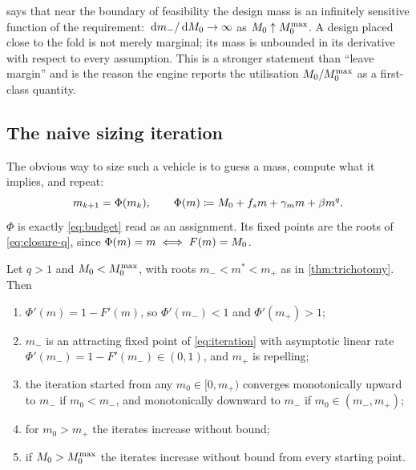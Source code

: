 \begin{remark}
 says that near the boundary of feasibility the design mass is
an infinitely sensitive function of the requirement: $\,\mathrm{d} m_-/\,\mathrm{d} M_0 \to
\infty$ as $M_0\uparrow M_0^{\max}$. A design placed close to the fold is not
merely marginal; its mass is unbounded in its derivative with respect to every
assumption. This is a stronger statement than ``leave margin'' and is the
reason the engine reports the utilisation $M_0/M_0^{\max}$ as a first-class
quantity.
\end{remark}

\subsection{The naive sizing iteration}

The obvious way to size such a vehicle is to guess a mass, compute what it
implies, and repeat:
\begin{equation}
  m_{k+1} = \Phi(m_k),
  \qquad
  \Phi(m) \coloneqq M_0 + f_s m + \gamma_m m + \beta m^{q} .
  \label{eq:iteration}
\end{equation}
$\Phi$ is exactly \cref{eq:budget} read as an assignment. Its fixed points are
the roots of \cref{eq:closure-q}, since
$\Phi(m)=m \iff F(m)=M_0$.

\begin{theorem}
\label{thm:iteration}
Let $q>1$ and $M_0<M_0^{\max}$, with roots $m_-<m^*<m_+$ as in
\cref{thm:trichotomy}. Then
\begin{enumerate}[label=(\roman*),nosep]
  \item $\Phi'(m) = 1 - F'(m)$, so $\Phi'(m_-)<1$ and $\Phi'(m_+)>1$;
  \item $m_-$ is an attracting fixed point of \cref{eq:iteration} with
        asymptotic linear rate $\Phi'(m_-) = 1-F'(m_-) \in (0,1)$, and $m_+$ is
        repelling;
  \item the iteration started from any $m_0 \in [0,m_+)$ converges
        monotonically upward to $m_-$ if $m_0<m_-$, and monotonically downward
        to $m_-$ if $m_0\in(m_-,m_+)$;
  \item for $m_0>m_+$ the iterates increase without bound;
  \item if $M_0>M_0^{\max}$ the iterates increase without bound from every
        starting point.
\end{enumerate}
\end{theorem}

